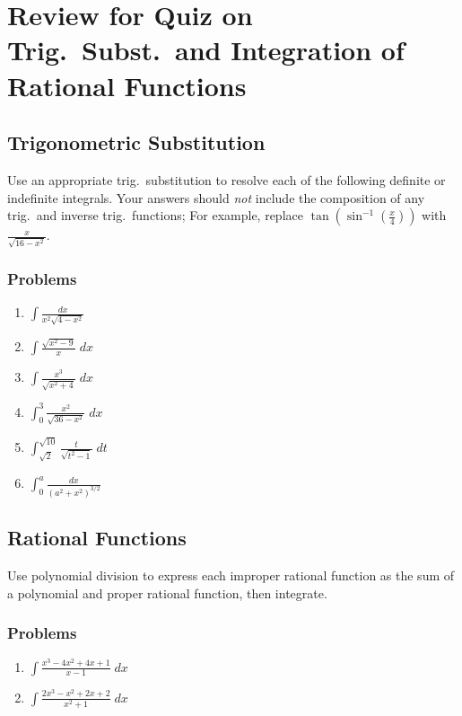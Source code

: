 \documentclass[12pt,letterpaper,fleqn]{article}
\newcommand{\ds}{\displaystyle}
\theoremstyle{definition}
\begin{document}
\section*{Review for Quiz on Trig.\ Subst.\ and Integration of Rational Functions}

\subsection*{Trigonometric Substitution}
Use an appropriate trig.\ substitution to resolve each of the following definite or indefinite integrals. Your answers should \emph{not} include the composition of any trig.\ and inverse trig.\ functions; For example, replace $\tan\left(\sin^{-1}\left(\frac{x}{4}\right)\right)$ with $\frac{x}{\sqrt{16-x^2}}$.
\subsubsection*{Problems}
\begin{enumerate}
  \item $\ds\int\frac{dx}{x^2\sqrt{4-x^2}}$
  \item $\ds\int\frac{\sqrt{x^2-9}}{x}\;dx$
  \item $\ds\int\frac{x^3}{\sqrt{x^2 + 4}}\;dx$
  \item $\ds\int_0^3 \frac{x^2}{\sqrt{36-x^2}}\;dx$
  \item $\ds\int_{\sqrt{2}}^{\sqrt{10}}\frac{t}{\sqrt{t^2-1}}\;dt$
  \item $\ds\int_0^a\frac{dx}{(a^2 + x^2)^{3/2}}$
\end{enumerate}
\subsection*{Rational Functions}
Use polynomial division to express each improper rational function as the sum of a polynomial and proper rational function, then integrate.
\subsubsection*{Problems}
\begin{enumerate}[resume]
  \item $\ds\int\frac{x^3-4x^2+4x+1}{x-1}\;dx$
  \item $\ds\int\frac{2x^3 - x^2 + 2x + 2}{x^2+1}\;dx$
\end{enumerate}
\newpage
\end{document}
